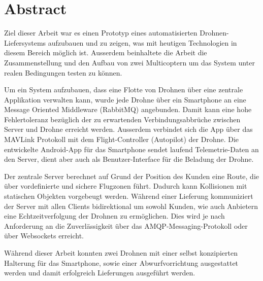 \newpage
{}
\chapter*{Abstract}
Ziel dieser Arbeit war es einen Prototyp eines automatisierten Drohnen-Liefersystems aufzubauen und zu zeigen, was mit heutigen Technologien in diesem Bereich möglich ist. Ausserdem beinhaltete die Arbeit die Zusammenstellung und den Aufbau von zwei Multicoptern um das System unter realen Bedingungen testen zu können.

Um ein System aufzubauen, dass eine Flotte von Drohnen über eine zentrale Applikation verwalten kann, wurde jede Drohne über ein Smartphone an eine Message Oriented Middleware (RabbitMQ) angebunden. Damit kann eine hohe Fehlertoleranz bezüglich der zu erwartenden Verbindungsabbrüche zwischen Server und Drohne erreicht werden. Ausserdem verbindet sich die App über das \Gls{MAVLink} Protokoll mit dem Flight-Controller (Autopilot) der Drohne. Die entwickelte Android-App für das Smartphone sendet laufend Telemetrie-Daten an den Server, dient aber auch als Benutzer-Interface für die Beladung der Drohne. 

Der zentrale Server berechnet auf Grund der Position des Kunden eine Route, die über vordefinierte und sichere Flugzonen führt. Dadurch kann Kollisionen mit statischen Objekten vorgebeugt werden. Während einer Lieferung kommuniziert der Server mit allen Clients bidirektional um sowohl Kunden, wie auch Anbietern eine Echtzeitverfolgung der Drohnen zu ermöglichen. Dies wird je nach Anforderung an die Zuverlässigkeit über das AMQP-Messaging-Protokoll oder über Websockets erreicht.  

Während dieser Arbeit konnten zwei Drohnen mit einer selbst konzipierten Halterung für das Smartphone, sowie einer Abwurfvorrichtung ausgestattet werden und damit erfolgreich Lieferungen ausgeführt werden. 




